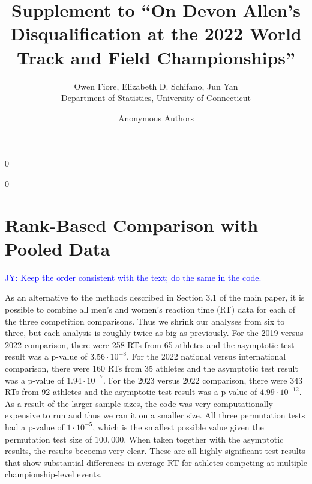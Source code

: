 \documentclass[12pt, letterpaper]{article}
\newcommand{\jy}[1]{\textcolor{blue}{JY: #1}}
\newcommand{\blind}{0}
\begin{document}
\title{\bf Supplement to ``On Devon Allen's Disqualification at the 2022 World Track and Field Championships''}

\blind
{
  \author{Owen Fiore, %
  Elizabeth D. Schifano, %
  Jun Yan\\[1ex]
  Department of Statistics, University of Connecticut\\
}
} \fi

\blind
{
  \bigskip
  \bigskip
  \bigskip
  \author{Anonymous Authors}
  \bigskip
} \fi

\maketitle 

\section{Rank-Based Comparison with Pooled Data}

\jy{Keep the order consistent with the text; do the same in the code.}

As an alternative to the methods described in Section 3.1 of the main paper, it
is possible to combine all men's and women's reaction time (RT) data for each of 
the three competition
comparisons.  Thus we shrink our analyses from six to three, but each analysis
is roughly twice as big as previously.  For the 2019 versus 2022 comparison,
there were 258 RTs from 65 athletes and the asymptotic
test result was a p-value of $3.56 \cdot 10^{-8}$. For the 2022 national versus
international comparison, there were 160 RTs from 35
athletes and the asymptotic test result was a p-value of $1.94 \cdot 10^{-7}$.
For the 2023 versus 2022 comparison, there were 343 RTs
from 92 athletes and the asymptotic test result was a p-value of
$4.99 \cdot 10^{-12}$.  As a result of the larger sample sizes, the code was
very computationally expensive to run and thus we ran it on a smaller size.  All
three permutation tests had a p-value of $1 \cdot 10^{-5}$, which is the smallest
possible value given the permutation test size of $100,000$.  When taken together
with the asymptotic results, the results becoems very clear. These are all
highly significant test results that show substantial differences in average RT
for athletes competing at multiple championship-level events.
\end{document}
